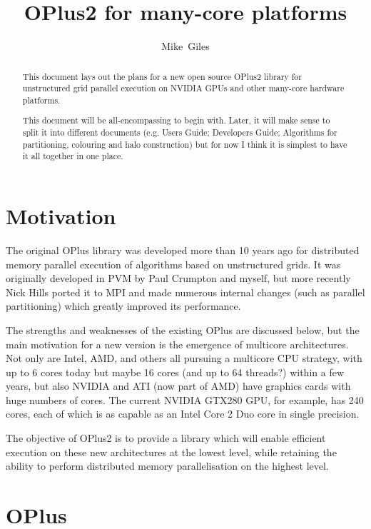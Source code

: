 \documentclass[12pt]{article}
\begin{document}
\title{OPlus2 for many-core platforms}
\author{Mike~Giles}

\maketitle

\begin{abstract}
This document lays out the plans for a new open source OPlus2 
library for unstructured grid parallel execution on NVIDIA GPUs
and other many-core hardware platforms.

This document will be all-encompassing to begin with.  Later, 
it will make sense to split it into different documents 
(e.g. Users Guide; Developers Guide; Algorithms for 
partitioning, colouring and halo construction) but for now 
I think it is simplest to have it all together in one place.
\end{abstract}


\section{Motivation}

The original OPlus library was developed more than 10 years ago
for distributed memory parallel execution of algorithms based
on unstructured grids. It was originally developed in PVM by
Paul Crumpton and myself, but more recently Nick Hills ported
it to MPI and made numerous internal changes (such as parallel
partitioning) which greatly improved its performance.

The strengths and weaknesses of the existing OPlus are discussed 
below, but the main motivation for a new version is the emergence 
of multicore architectures.  Not only are Intel, AMD, and others
all pursuing a multicore CPU strategy, with up to 6 cores today 
but maybe 16 cores (and up to 64 threads?) within a few years, 
but also NVIDIA and ATI (now part of AMD) have graphics cards 
with huge numbers of cores.  The current NVIDIA GTX280 GPU, 
for example, has 240 cores, each of which is as capable as an 
Intel Core 2 Duo core in single precision.

The objective of OPlus2 is to provide a library which will enable
efficient execution on these new architectures at the lowest 
level, while retaining the ability to perform distributed memory 
parallelisation on the highest level.


\newpage

\section{OPlus}
\end{document}
